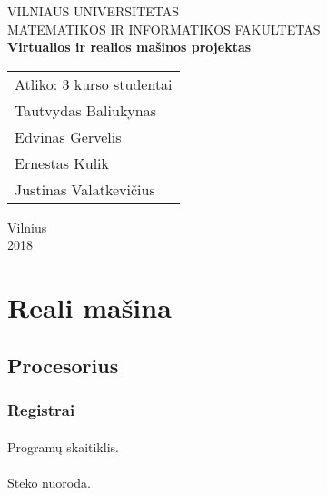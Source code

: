 \documentclass{scrartcl}
\begin{document}
    \newcommand{\instr}[3]{\subparagraph{\makebox[6em][l]{\texttt{#1}}} (\texttt{#2})\par#3\par}
    \begin{titlepage}
        \begin{center}
            VILNIAUS UNIVERSITETAS \\
            MATEMATIKOS IR INFORMATIKOS FAKULTETAS \\
            \vspace{4cm}
            \Large\textbf{Virtualios ir realios mašinos projektas}
        \end{center}
        \vspace{4cm}
        \begin{flushright}
            \begin{tabular}[t]{l}
                Atliko: 3 kurso studentai \\
                Tautvydas Baliukynas \\
                Edvinas Gervelis \\
                Ernestas Kulik \\
                Justinas Valatkevičius
            \end{tabular}
        \end{flushright}
        \vspace*{\fill}
        \begin{center}
            \large{Vilnius \\ 2018}
        \end{center}
    \end{titlepage}
    \section{Reali mašina}
        \subsection{Procesorius}
            \subsubsection{Registrai}
                \paragraph{} Programų skaitiklis.
                \paragraph{} Steko nuoroda.
\end{document}
